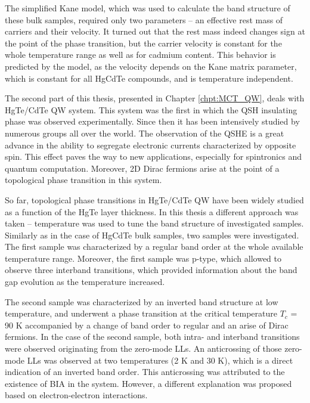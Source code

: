 \documentclass[titlepage,a4paper]{book}
\begin{document}
The simplified Kane model, which was used to calculate the band structure of these bulk samples, required only two parameters -- an effective rest mass of carriers and their velocity. It turned out that the rest mass indeed changes sign at the point of the phase transition, but the carrier velocity is constant for the whole temperature range as well as for cadmium content. This behavior is predicted by the model, as the velocity depends on the Kane matrix parameter, which is constant for all HgCdTe compounds, and is temperature independent. 

\vspace{5mm}

The second part of this thesis, presented in Chapter \ref{chpt:MCT_QW}, deals with HgTe/CdTe QW system. This system was the first in which the QSH insulating phase was observed experimentally. Since then it has been intensively studied by numerous groups all over the world. The observation of the QSHE is a great advance in the ability to segregate electronic currents characterized by opposite spin. This effect paves the way to new applications, especially for spintronics and quantum computation. Moreover, 2D Dirac fermions arise at the point of a topological phase transition in this system. 

So far, topological phase transitions in HgTe/CdTe QW have been widely studied as a function of the HgTe layer thickness. In this thesis a different approach was taken -- temperature was used to tune the band structure of investigated samples. Similarly as in the case of HgCdTe bulk samples, two samples were investigated. The first sample was characterized by a regular band order at the whole available temperature range. Moreover, the first sample was p-type, which allowed to observe three interband transitions, which provided information about the band gap evolution as the temperature increased. 

The second sample was characterized by an inverted band structure at low temperature, and underwent a phase transition at the critical temperature $T_c$ = 90 K accompanied by a change of band order to regular and an arise of Dirac fermions. In the case of the second sample, both intra- and interband transitions were observed originating from the zero-mode LLs. An anticrossing of those zero-mode LLs was observed at two temperatures (2 K and 30 K), which is a direct indication of an inverted band order. This anticrossing was attributed to the existence of BIA in the system. However, a different explanation was proposed based on electron-electron interactions.
\end{document}
